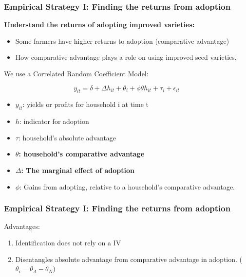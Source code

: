 \documentclass{beamer}
\begin{document}
\begin{frame}
\frametitle{Empirical Strategy I: Finding the returns from adoption}

\textbf{Understand the returns of adopting improved varieties: }
\begin{itemize}
    \item Some farmers have higher returns to adoption (comparative advantage)
    \item How comparative advantage plays a role on using improved seed varieties.
\end{itemize}  


We use a Correlated Random Coefficient Model:
\vspace{-2em}
\begin{center}
$$
    y_{it}= \delta + \Delta h_{it} + \theta_{i} + \phi\theta h_{it} + \tau_{i} + \epsilon_{it}
$$  
\end{center}

\begin{itemize}
    \item $y_{it}$: yields or profits for household i at time t
    \item $h$:  indicator for adoption
    \item $\tau$:  household’s absolute advantage
    \item \textbf{$\theta$: household’s comparative advantage}
    \item \textbf{$\Delta$: The marginal effect of adoption}
    \item $\phi$: Gains from adopting, relative to a household’s comparative advantage.
\end{itemize}

\end{frame}


\begin{frame}
\frametitle{Empirical Strategy I: Finding the returns from adoption}

Advantages:
\begin{enumerate}
    \item Identification does not rely on a IV 
    \item Disentangles absolute advantage from comparative advantage in adoption. ($\theta_i = \theta_A - \theta_N$)
\end{enumerate}


\end{frame}
\end{document}
